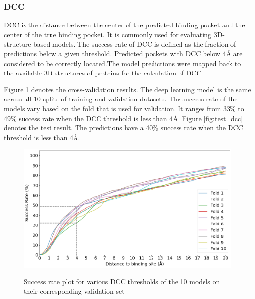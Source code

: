 \documentclass[journal=jacsat,manuscript=article]{achemso}
\begin{document}
\subsubsection{DCC}
DCC is the distance between the center of the predicted binding pocket and the center of the true binding pocket. It is commonly used for evaluating 3D-structure based models. The success rate of DCC is defined as the fraction of predictions below a given threshold. Predicted pockets with DCC below 4{\AA} are considered to be correctly located.The model predictions were mapped back to the available 3D structures of proteins for the calculation of DCC.

Figure \ref{fig:valid_dcc} denotes the cross-validation results. The deep learning model is the same across all 10 splits of training and validation datasets. The success rate of the models vary based on the fold that is used for validation. It ranges from 33\% to 49\% success rate when the DCC threshold is less than 4\AA. Figure \ref{fig:test_dcc} denotes the test result. The predictions have a 40\% success rate when the DCC threshold is less than 4\AA.

\vspace{10 mm}
\begin{figure}
    \caption{\centering Success rate plot for various DCC thresholds of the 10 models on their corresponding validation set}
    \centering
    \noindent\includegraphics[scale=0.45]{valid_dcc.png}
    \label{fig:valid_dcc}
\end{figure}
\end{document}
